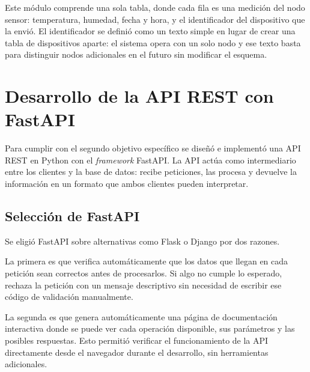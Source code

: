 Este módulo comprende una sola tabla, donde cada fila es una medición del nodo sensor: temperatura, humedad, fecha y hora, y el identificador del dispositivo que la envió. El identificador se definió como un texto simple en lugar de crear una tabla de dispositivos aparte: el sistema opera con un solo nodo y ese texto basta para distinguir nodos adicionales en el futuro sin modificar el esquema.




\clearpage
\section{Desarrollo de la API REST con FastAPI}

Para cumplir con el segundo objetivo específico se diseñó e implementó una API REST en Python con el \textit{framework} FastAPI. La API actúa como intermediario entre los clientes y la base de datos: recibe peticiones, las procesa y devuelve la información en un formato que ambos clientes pueden interpretar.      

\subsection{Selección de FastAPI}

Se eligió FastAPI sobre alternativas como Flask o Django por dos razones.

La primera es que verifica automáticamente que los datos que llegan en cada petición sean correctos antes de procesarlos. Si algo no cumple lo esperado, rechaza la petición con un mensaje descriptivo sin necesidad de escribir ese código de validación manualmente.

La segunda es que genera automáticamente una página de documentación interactiva donde se puede ver cada operación disponible, sus parámetros y las posibles respuestas. Esto permitió verificar el funcionamiento de la API directamente desde el navegador durante el desarrollo, sin herramientas adicionales.

